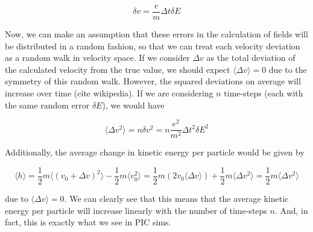 \begin{equation}
	\delta v = \frac{e}{m} \Delta t \delta E
\end{equation}

Now, we can make an assumption that these errors in the calculation of fields will be distributed in a random fashion, so that we can treat each velocity deviation as a random walk in velocity space. If we consider $\Delta v$ as the total deviation of the calculated velocity from the true value, we should expect $\langle \Delta v \rangle = 0$ due to the symmetry of this random walk. However, the squared deviations on average will increase over time (cite wikipedia). If we are considering $n$ time-steps (each with the same random error $\delta E$), we would have 

\begin{equation}
	\langle \Delta v^2 \rangle = n \delta v ^2 = n \frac{e^2}{m^2} \Delta t^2 \delta E^2
\end{equation}

Additionally, the average change in kinetic energy per particle would be given by 

\begin{equation}
	\langle h \rangle  = \frac{1}{2} m \langle (v_0 + \Delta v)^2 \rangle - \frac{1}{2} m \langle v_0^2 \rangle = \frac{1}{2} m (2 v_0 \langle \Delta v \rangle) + \frac{1}{2} m \langle \Delta v^2 \rangle = \frac{1}{2} m \langle \Delta v^2 \rangle
\end{equation}

due to $\langle \Delta v \rangle = 0$. We can clearly see that this means that the average kinetic energy per particle will increase linearly with the number of time-steps $n$. And, in fact, this is exactly what we see in PIC sims. 

